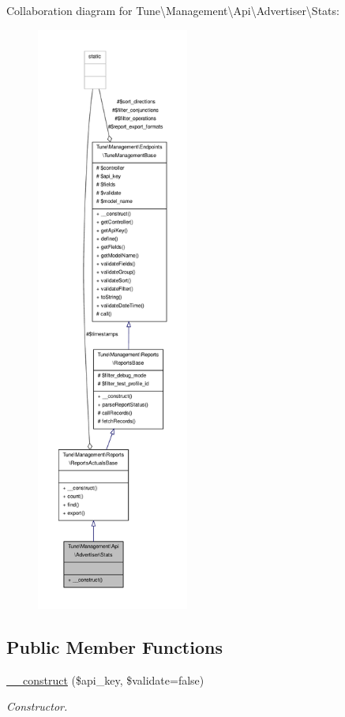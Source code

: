 Collaboration diagram for Tune\textbackslash{}Management\textbackslash{}Api\textbackslash{}Advertiser\textbackslash{}Stats\-:
\nopagebreak
\begin{figure}[H]
\begin{center}
\leavevmode
\includegraphics[height=550pt]{classTune_1_1Management_1_1Api_1_1Advertiser_1_1Stats__coll__graph}
\end{center}
\end{figure}
\subsection*{Public Member Functions}
\begin{DoxyCompactItemize}
\item 
\hyperlink{classTune_1_1Management_1_1Api_1_1Advertiser_1_1Stats_a0f653fdb6aa456c9aabc75c66f739ca1}{\-\_\-\-\_\-construct} (\$api\-\_\-key, \$validate=false)
\begin{DoxyCompactList}\small\item\em Constructor. \end{DoxyCompactList}\end{DoxyCompactItemize}
